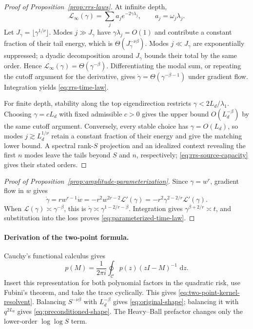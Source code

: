\documentclass[11pt,a4paper]{article}
\numberwithin{equation}{section}
\theoremstyle{definition}
\theoremstyle{remark}
\newcommand{\loss}{\mathcal L}
\newcommand{\dd}{\,\mathrm d}
\begin{document}
\begin{proof}[Proof of Proposition~\ref{prop:rrs-laws}]
At infinite depth,
\[
 \loss_\infty(\gamma)=
 \sum_j a_je^{-2\gamma\lambda_j},
 \qquad a_j=\omega_j\lambda_j.
\]
Let $J_\gamma=\lfloor\gamma^{1/\nu}\rfloor$.  Modes
$j\gg J_\gamma$ have $\gamma\lambda_j=O(1)$ and contribute a constant
fraction of their tail energy, which is $\Theta(J_\gamma^{-\nu\beta})$.
Modes $j\ll J_\gamma$ are exponentially suppressed; a dyadic decomposition
around $J_\gamma$ bounds their total by the same order.  Hence
$\loss_\infty(\gamma)=\Theta(\gamma^{-\beta})$.  Differentiating the
modal sum, or repeating the cutoff argument for the derivative, gives
$\dot\gamma=\Theta(\gamma^{-\beta-1})$ under gradient flow.  Integration
yields \eqref{eq:rrs-time-law}.

For finite depth, stability along the top eigendirection restricts
$\gamma<2L_d/\lambda_1$.  Choosing $\gamma=cL_d$ with fixed admissible $c>0$
gives the upper bound $O(L_d^{-\beta})$ by the same cutoff argument.  Conversely,
every stable choice has $\gamma=O(L_d)$, so modes
$j\gtrsim L_d^{1/\nu}$ retain a constant fraction of their energy and give the
matching lower bound.  A spectral rank-$S$ projection and an idealized
context revealing the first $n$ modes leave the tails beyond $S$ and $n$,
respectively;
\eqref{eq:rrs-source-capacity} gives their stated orders.
\end{proof}

\begin{proof}[Proof of Proposition~\ref{prop:amplitude-parameterization}]
Since $\gamma=w^r$, gradient flow in $w$ gives
\[
 \dot\gamma
 =r w^{r-1}\dot w
 =-r^2w^{2r-2}\loss'(\gamma)
 =-r^2\gamma^{2-2/r}\loss'(\gamma).
\]
When $\loss(\gamma)\asymp\gamma^{-\beta}$, this is
$\dot\gamma\asymp\gamma^{1-2/r-\beta}$.  Integration gives
$\gamma^{\beta+2/r}\asymp t$, and substitution into the loss proves
\eqref{eq:parameterized-time-law}.
\end{proof}

\paragraph{Derivation of the two-point formula.}
Cauchy's functional calculus gives
\[
 p(M)=\frac{1}{2\pi i}\oint_{\mathcal C}
 p(z)(zI-M)^{-1}\,\dd z.
\]
Insert this representation for both polynomial factors in the quadratic risk,
use Fubini's theorem, and take the trace cyclically.  This gives
\eqref{eq:two-point-kernel-resolvent}.  Balancing
$S^{-\nu\beta}$ with $L_d^{-\beta}$ gives
\eqref{eq:original-shape}; balancing it with $q^{2L_d}$ gives
\eqref{eq:preconditioned-shape}.  The Heavy--Ball prefactor changes only the
lower-order $\log\log S$ term.
\end{document}
